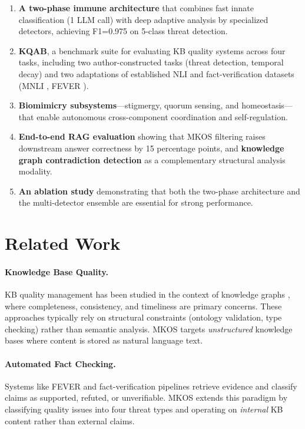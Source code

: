 \documentclass[11pt]{article}
\begin{document}
\begin{enumerate}
    \item \textbf{A two-phase immune architecture} that combines fast innate classification (1 LLM call) with deep adaptive analysis by specialized detectors, achieving F1=0.975 on 5-class threat detection.
    \item \textbf{KQAB}, a benchmark suite for evaluating KB quality systems across four tasks, including two author-constructed tasks (threat detection, temporal decay) and two adaptations of established NLI and fact-verification datasets (MNLI \citep{williams2018broad}, FEVER \citep{thorne2018fever}).
    \item \textbf{Biomimicry subsystems}---stigmergy, quorum sensing, and homeostasis---that enable autonomous cross-component coordination and self-regulation.
    \item \textbf{End-to-end RAG evaluation} showing that MKOS filtering raises downstream answer correctness by 15 percentage points, and \textbf{knowledge graph contradiction detection} as a complementary structural analysis modality.
    \item \textbf{An ablation study} demonstrating that both the two-phase architecture and the multi-detector ensemble are essential for strong performance.
\end{enumerate}

\section{Related Work}
\label{sec:related}

\paragraph{Knowledge Base Quality.} KB quality management has been studied in the context of knowledge graphs \citep{paulheim2017knowledge, zaveri2016quality}, where completeness, consistency, and timeliness are primary concerns. These approaches typically rely on structural constraints (ontology validation, type checking) rather than semantic analysis. MKOS targets \emph{unstructured} knowledge bases where content is stored as natural language text.

\paragraph{Automated Fact Checking.} Systems like FEVER \citep{thorne2018fever} and fact-verification pipelines \citep{guo2022survey} retrieve evidence and classify claims as supported, refuted, or unverifiable. MKOS extends this paradigm by classifying quality issues into four threat types and operating on \emph{internal} KB content rather than external claims.
\end{document}
